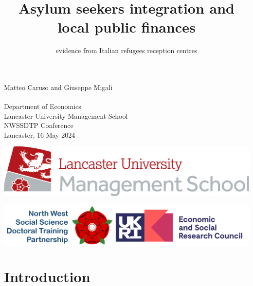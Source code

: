 \documentclass[xcolor={dvipsnames}]{beamer}
\title{Asylum seekers integration and local public finances}
\subtitle{\footnotesize evidence from Italian refugees reception centres}
\date{}
\begin{document}
\begin{frame}[t]\vspace{-1cm}
\maketitle
\vspace{-2.5cm}
\centering
\small
Matteo Caruso and Giuseppe Migali \\ 
\vspace{10} \\ 
\tiny
Department of Economics \\
\vspace{1}
Lancaster University Management School \\ 
\vspace{5}
\small 
NWSSDTP Conference \\
\tiny
\vspace{3}
Lancaster, 16 May 2024 \\
\vspace{10}


\begin{minipage}[t]{.5\linewidth}
    \centering
\includegraphics[scale = 0.4]{images/logo lums.jpg}
\end{minipage}\hfill
\begin{minipage}[t]{.5\linewidth}
    \centering
\includegraphics[scale = 0.14]{images/nwssdtplogo.png}
\end{minipage}

    
\end{frame}

\section{Introduction}
\end{document}
